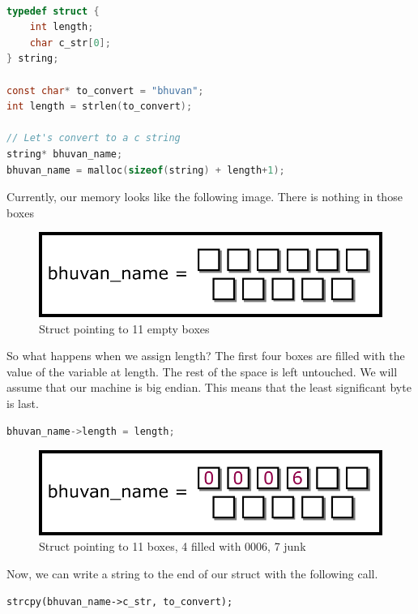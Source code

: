 \begin{lstlisting}[language=C]

typedef struct {
    int length;
    char c_str[0];
} string;

const char* to_convert = "bhuvan";
int length = strlen(to_convert);

// Let's convert to a c string
string* bhuvan_name;
bhuvan_name = malloc(sizeof(string) + length+1);
\end{lstlisting}

Currently, our memory looks like the following image.
There is nothing in those boxes

\begin{figure}[H]
\centering
\includegraphics[width=.7\textwidth]{introc/drawings/memory_model_empty.png}
\caption{Struct pointing to 11 empty boxes}
\end{figure}

So what happens when we assign length?
The first four boxes are filled with the value of the variable at length.
The rest of the space is left untouched.
We will assume that our machine is big endian.
This means that the least significant byte is last.

\begin{lstlisting}[language=C]
bhuvan_name->length = length;
\end{lstlisting}

\begin{figure}[H]
\centering
\includegraphics[width=.7\textwidth]{introc/drawings/memory_model_length.png}
\caption{Struct pointing to 11 boxes, 4 filled with 0006, 7 junk}
\end{figure}

Now, we can write a string to the end of our struct with the following call.

\begin{verbatim}
strcpy(bhuvan_name->c_str, to_convert);
\end{verbatim}

